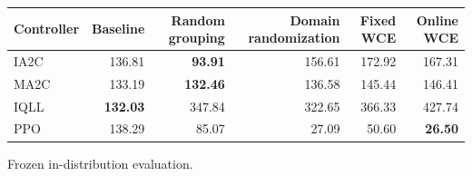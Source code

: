 \begin{tabular}{lrrrrr}
\hline
Controller & Baseline & Random grouping & Domain randomization & Fixed WCE & Online WCE \\
\hline
IA2C & 136.81 & \textbf{93.91} & 156.61 & 172.92 & 167.31 \\
MA2C & 133.19 & \textbf{132.46} & 136.58 & 145.44 & 146.41 \\
IQLL & \textbf{132.03} & 347.84 & 322.65 & 366.33 & 427.74 \\
PPO & 138.29 & 85.07 & 27.09 & 50.60 & \textbf{26.50} \\
\hline
\end{tabular}
Frozen in-distribution evaluation.
